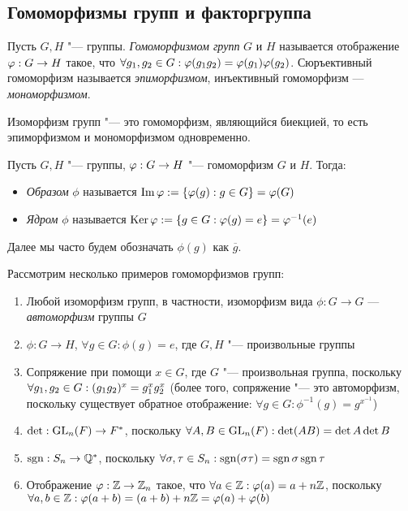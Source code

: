 \subsection{Гомоморфизмы групп и факторгруппа}

\begin{definition}
	Пусть $G, H$ "--- группы. \textit{Гомоморфизмом групп} $G$ и $H$ называется отображение $\phi : G \hm\to H$ такое, что $\forall g_1, g_2 \hm\in G: \phi(g_1g_2) \hm= \phi(g_1)\phi(g_2)$. Сюръективный гомоморфизм называется \textit{эпиморфизмом}, инъективный гомоморфизм --- \textit{мономорфизмом}.
\end{definition}

\begin{note}
	Изоморфизм групп "--- это гомоморфизм, являющийся биекцией, то есть эпиморфизмом и мономорфизмом одновременно.
\end{note}

\begin{definition}
	Пусть $G, H$ "--- группы, $\phi : G \hm\to H$ "--- гомоморфизм $G$ и $H$. Тогда:
	\begin{itemize}
		\item \textit{Образом} $\phi$ называется $\operatorname{Im}\varphi := \{\varphi(g): g \in G\} = \varphi(G)$
		\item \textit{Ядром} $\phi$ называется $\operatorname{Ker}\varphi := \{g \in G: \varphi(g) = e\} = \varphi^{-1}(e)$
	\end{itemize}
\end{definition}

\begin{note}
	Далее мы часто будем обозначать $\phi(g)$ как $\overline{g}$.
\end{note}

\begin{example}
	Рассмотрим несколько примеров гомоморфизмов групп:
	\begin{enumerate}
		\item Любой изоморфизм групп, в частности, изоморфизм вида $\phi: G \to G$ --- \textit{автоморфизм} группы $G$
		\item $\phi: G \to H$, $\forall g \in G: \phi(g) = e$, где $G, H$ "--- произвольные группы
		\item Сопряжение при помощи $x \in G$, где $G$ "--- произвольная группа, поскольку $\forall g_1, g_2 \hm\in G: (g_1g_2)^x = g_1^xg_2^x$ (более того, сопряжение "--- это автоморфизм, поскольку существует обратное отображение: $\forall g \in G: \phi^{-1}(g) = g^{x^{-1}}$)
		\item $\det: \operatorname{GL}_n(F) \to F^*$, поскольку $\forall A, B \in \GL_n(F): \det(AB) \hm= \det A \det B$
		\item $\operatorname{\mathop{sgn}}: S_n \to \mathbb{Q}^*$, поскольку $\forall \sigma, \tau \in S_n: \sgn(\sigma\tau) \hm= \sgn\sigma\sgn\tau$
		\item Отображение $\varphi: \mathbb{Z} \to \mathbb{Z}_n$ такое, что $\forall a \in \mathbb{Z}: \varphi(a) = a + n\mathbb{Z}$, поскольку $\forall a, b \in \Z: \phi(a + b) \hm= (a + b) + n\Z = \phi(a) + \phi(b)$
	\end{enumerate}
\end{example}

